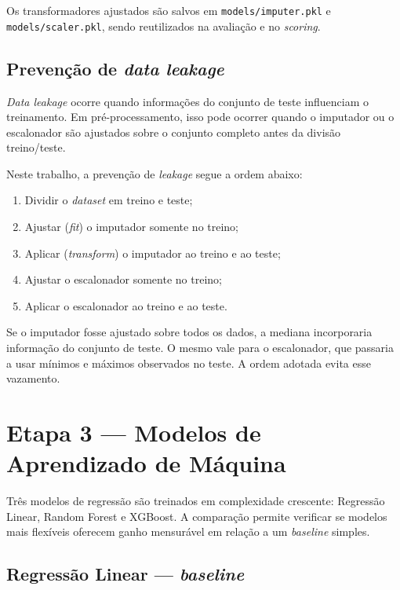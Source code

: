 \documentclass[conference]{IEEEtran}
\begin{document}
Os transformadores ajustados são salvos em \texttt{models/imputer.pkl} e
\texttt{models/scaler.pkl}, sendo reutilizados na avaliação e no
\textit{scoring}.

\subsection{Prevenção de \textit{data leakage}}
\label{sec:leakage}

\textit{Data leakage} ocorre quando informações do conjunto de teste
influenciam o treinamento. Em pré-processamento, isso pode ocorrer quando
o imputador ou o escalonador são ajustados sobre o conjunto completo antes
da divisão treino/teste.

Neste trabalho, a prevenção de \textit{leakage} segue a ordem abaixo:

\begin{enumerate}
\item Dividir o \textit{dataset} em treino e teste;
\item Ajustar (\textit{fit}) o imputador somente no treino;
\item Aplicar (\textit{transform}) o imputador ao treino e ao teste;
\item Ajustar o escalonador somente no treino;
\item Aplicar o escalonador ao treino e ao teste.
\end{enumerate}

Se o imputador fosse ajustado sobre todos os dados, a mediana incorporaria
informação do conjunto de teste. O mesmo vale para o escalonador, que
passaria a usar mínimos e máximos observados no teste. A ordem adotada evita
esse vazamento.

\section{Etapa 3 — Modelos de Aprendizado de Máquina}
\label{sec:models}

Três modelos de regressão são treinados em complexidade crescente:
Regressão Linear, Random Forest e XGBoost. A comparação permite verificar
se modelos mais flexíveis oferecem ganho mensurável em relação a um
\textit{baseline} simples.

\subsection{Regressão Linear — \textit{baseline}}
\end{document}
